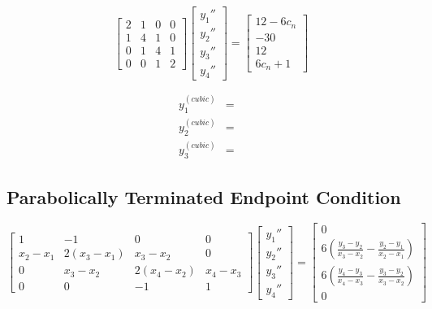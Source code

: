 \documentclass[11pt]{article} %
\begin{document}
$$\begin{bmatrix} 2 & 1 & 0 & 0 \\ 1 & 4 &1 & 0 
		 \\ 0 & 1 & 4 & 1 \\ 0 & 0 & 1 & 2
\end{bmatrix}
\begin{bmatrix} y_1'' \\ y_2'' \\ y_3'' \\ y_4'' \end{bmatrix} = 
\begin{bmatrix} 12-6c_n \\ -30 \\ 12 \\ 6c_n +1 \end{bmatrix}$$

$$\begin{array}{lclcl} y^{(cubic)}_1 & = &  \\
		        y^{(cubic)}_2  & = &  \\
		        y^{(cubic)}_3  & = & 
\end{array}$$



\subsection*{Parabolically Terminated Endpoint Condition}

$$\begin{bmatrix} 1 & -1 & 0 & 0 \\ x_2 - x_1 & 2(x_3 - x_1) & x_3 - x_2 & 0 
		 \\ 0 & x_3 - x_2 & 2(x_4 - x_2) & x_4 - x_3 \\ 0 & 0 & -1 & 1
\end{bmatrix}
\begin{bmatrix} y_1'' \\ y_2'' \\ y_3'' \\ y_4'' \end{bmatrix} = 
\begin{bmatrix} 0 \\ 6\left( \frac{y_3 - y_2}{x_3 - x_2} - \frac{y_2-y_1}{x_2 - x_1} \right) \\ 
			 6\left( \frac{y_4 - y_3}{x_4 - x_3} - \frac{y_3-y_2}{x_3 - x_2} \right) \\ 0\end{bmatrix}$$
\end{document}

